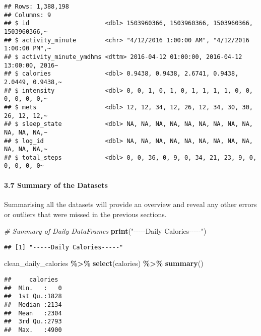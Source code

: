 \documentclass[
]{article}
\newenvironment{Shaded}{\begin{snugshade}}{\end{snugshade}}
\newcommand{\CommentTok}[1]{\textcolor[rgb]{0.56,0.35,0.01}{\textit{#1}}}
\newcommand{\FunctionTok}[1]{\textcolor[rgb]{0.13,0.29,0.53}{\textbf{#1}}}
\newcommand{\NormalTok}[1]{#1}
\newcommand{\SpecialCharTok}[1]{\textcolor[rgb]{0.81,0.36,0.00}{\textbf{#1}}}
\newcommand{\StringTok}[1]{\textcolor[rgb]{0.31,0.60,0.02}{#1}}
\begin{document}
\begin{verbatim}
## Rows: 1,388,198
## Columns: 9
## $ id                     <dbl> 1503960366, 1503960366, 1503960366, 1503960366,~
## $ activity_minute        <chr> "4/12/2016 1:00:00 AM", "4/12/2016 1:00:00 PM",~
## $ activity_minute_ymdhms <dttm> 2016-04-12 01:00:00, 2016-04-12 13:00:00, 2016~
## $ calories               <dbl> 0.9438, 0.9438, 2.6741, 0.9438, 2.0449, 0.9438,~
## $ intensity              <dbl> 0, 0, 1, 0, 1, 0, 1, 1, 1, 1, 0, 0, 0, 0, 0, 0,~
## $ mets                   <dbl> 12, 12, 34, 12, 26, 12, 34, 30, 30, 26, 12, 12,~
## $ sleep_state            <dbl> NA, NA, NA, NA, NA, NA, NA, NA, NA, NA, NA, NA,~
## $ log_id                 <dbl> NA, NA, NA, NA, NA, NA, NA, NA, NA, NA, NA, NA,~
## $ total_steps            <dbl> 0, 0, 36, 0, 9, 0, 34, 21, 23, 9, 0, 0, 0, 0, 0~
\end{verbatim}

\hypertarget{summary-of-the-datasets}{%
\paragraph{3.7 Summary of the Datasets}\label{summary-of-the-datasets}}

Summarising all the datasets will provide an overview and reveal any
other errors or outliers that were missed in the previous sections.

\begin{Shaded}
\begin{Highlighting}[]
\CommentTok{\# Summary of Daily DataFrames}
\FunctionTok{print}\NormalTok{(}\StringTok{"{-}{-}{-}{-}{-}Daily Calories{-}{-}{-}{-}{-}"}\NormalTok{)}
\end{Highlighting}
\end{Shaded}

\begin{verbatim}
## [1] "-----Daily Calories-----"
\end{verbatim}

\begin{Shaded}
\begin{Highlighting}[]
\NormalTok{clean\_daily\_calories }\SpecialCharTok{\%\textgreater{}\%} 
  \FunctionTok{select}\NormalTok{(calories) }\SpecialCharTok{\%\textgreater{}\%} 
  \FunctionTok{summary}\NormalTok{()}
\end{Highlighting}
\end{Shaded}

\begin{verbatim}
##     calories   
##  Min.   :   0  
##  1st Qu.:1828  
##  Median :2134  
##  Mean   :2304  
##  3rd Qu.:2793  
##  Max.   :4900
\end{verbatim}
\end{document}

